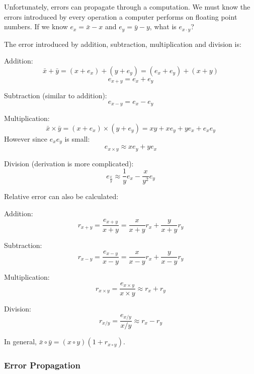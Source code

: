 Unfortunately, errors can propagate through a computation. We must know the
errors introduced by every operation a computer performs on floating point
numbers. If we know $e_x = \bar{x} - x$ and $e_y = \bar{y} - y$, what is $e_{x
\cdot y}$?

The error introduced by addition, subtraction, multiplication and division is:

\begin{description}
  \item Addition:
  \[
    \bar{x} + \bar{y} = (x + e_x) + (y + e_y) = (e_x + e_y) + (x + y)
  \]
  \[
    e_{x+y} = e_x + e_y
  \]
  \item Subtraction (similar to addition):
  \[
    e_{x-y} = e_x - e_y
  \]
  \item Multiplication:
  \[
    \bar{x} \times \bar{y} = (x + e_x) \times (y + e_y) =
      xy + xe_y + ye_x + e_xe_y
  \]
  However since $e_xe_y$ is small:
  \[
    e_{x \times y} \approx xe_y + ye_x
  \]
  \item Division (derivation is more complicated):
  \[
    e_\frac{x}{y} \approx \frac{1}{y}e_x - \frac{x}{y^2}e_y
  \]
\end{description}

Relative error can also be calculated:

\begin{description}
  \item Addition:
    \[
      r_{x+y} = \frac{e_{x+y}}{x + y} = \frac{x}{x + y}r_x + \frac{y}{x + y}r_y
    \]
  \item Subtraction:
    \[
      r_{x-y} = \frac{e_{x-y}}{x - y} = \frac{x}{x - y}r_x + \frac{y}{x - y}r_y
    \]
  \item Multiplication:
    \[
      r_{x \times y} = \frac{e_{x \times y}}{x \times y} \approx r_x + r_y
    \]
  \item Division:
    \[
      r_{x / y} = \frac{e_{x / y}}{x / y} \approx r_x - r_y
    \]
\end{description}

In general, $\bar{x} \circ \bar{y} = (x \circ y)(1 + r_{x \circ y})$.

\subsubsection{Error Propagation}


